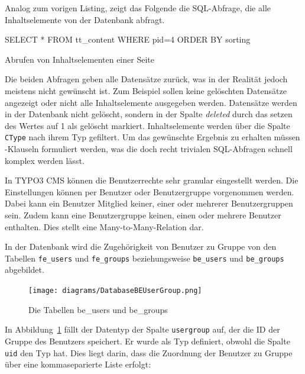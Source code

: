 Analog zum vorigen Listing, zeigt das Folgende die SQL-Abfrage, die alle Inhaltselemente von der Datenbank abfragt.

\begin{listing}
	\begin{phpcode}
SELECT * FROM tt_content WHERE pid=4 ORDER BY sorting
	\end{phpcode}
	\caption{Abrufen von Inhaltselementen einer Seite}
	\label{lst:getContentElements}
\end{listing}

Die beiden Abfragen geben alle Datensätze zurück, was in der Realität jedoch meistens nicht gewünscht ist. Zum Beispiel sollen keine gelöschten Datensätze angezeigt oder nicht alle Inhaltselemente ausgegeben werden. Datensätze werden in der Datenbank nicht gelöscht, sondern in der Spalte \textit{deleted} durch das setzen des Wertes auf 1 als gelöscht markiert. Inhaltselemente werden über die Spalte \texttt{CType} nach ihrem Typ gefiltert. Um das gewünschte Ergebnis zu erhalten müssen -Klauseln formuliert werden, was die doch recht trivialen SQL-Abfragen schnell komplex werden lässt.

In TYPO3 CMS können die Benutzerrechte sehr granular eingestellt werden. Die Einstellungen können per Benutzer oder Benutzergruppe vorgenommen werden.
Dabei kann ein Benutzer Mitglied keiner, einer oder mehrerer Benutzergruppen sein. Zudem kann eine Benutzergruppe keinen, einen oder mehrere Benutzer enthalten. Dies stellt eine Many-to-Many-Relation dar.

In der Datenbank wird die Zugehörigkeit von Benutzer zu Gruppe von den Tabellen \texttt{fe\_users} und \texttt{fe\_groups} beziehungsweise \texttt{be\_users} und \texttt{be\_groups} abgebildet.

\begin{figure}[H]
	\centering
	\texttt{[image: diagrams/DatabaseBEUserGroup.png]}
	\caption{Die Tabellen be\_users und be\_groups}
	\label{fig:beUsersAndBeGroups}
\end{figure}

In Abbildung~\ref{fig:beUsersAndBeGroups} fällt der Datentyp der Spalte \texttt{usergroup} auf, der die ID der Gruppe des Benutzers speichert. Er wurde als Typ  definiert, obwohl die Spalte \texttt{uid} den Typ  hat. Dies liegt darin, dass die Zuordnung der Benutzer zu Gruppe über eine kommaseparierte Liste erfolgt:

